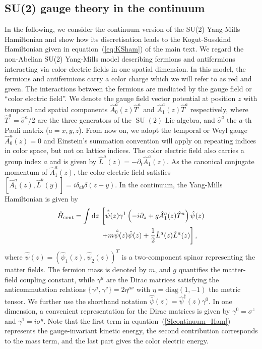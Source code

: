 \documentclass[twocolumn,aps,showpacs,prb,superscriptaddress,floatfix,10pt,nofootinbib]{revtex4-2}
\renewcommand{\eqref}[1]{equation~(\ref{#1})}
\begin{document}
\subsection{SU(2) gauge theory in the continuum}
\label{SI:continuum}
In the following, we consider the continuum version of the SU(2) Yang-Mills Hamiltonian and show how its discretisation leads to the Kogut-Susskind Hamiltonian given in \eqref{eq:KSham} of the main text. 
We regard the non-Abelian SU(2) Yang-Mills model describing fermions and antifermions interacting via color electric fields in one spatial dimension. In this model, the fermions and antifermions carry a color charge which we will refer to as red and green. The interactions between the fermions are mediated by the gauge field or ``color electric field''. We denote the gauge field vector potential at position $z$ with temporal and spatial components $\hat{A}_{0}^{a}(z)\hat{T}^{a}$ and $\hat{A}_{1}^{a}(z)\hat{T}^{a}$ respectively, where $\hat{T}^{a}=\hat{\sigma}^{a}/2$ are the three generators of the $\operatorname{SU}(2)$ Lie algebra, and $\hat{\sigma}^{a}$ the $a$-th Pauli matrix ($a=x,y,z$). From now on, we adopt the temporal or Weyl gauge $\hat{A}_{0}^{a}(z)=0$ and Einstein's summation convention will apply on repeating indices in color space, but not on lattice indices. The color electric field also carries a group index $a$ and is given by $\hat{L}^{a}(z)=-\partial_{t}\hat{A}_{1}^{a}(z)$. As the canonical conjugate momentum of $\hat{A}_{1}^{a}(z)$, the color electric field satisfies $[\hat{A}_{1}^{a}(z),\hat{L}^{b}(y)]=i\delta_{ab}\delta(z-y)$. In the continuum, the Yang-Mills Hamiltonian is given by \cite{jackiw1980introduction}
\begin{equation}
\begin{split}
\hat{H}_{\mathrm{cont}} =\int \mathrm{d}z  \, & \left[ {\vphantom{\frac{1}{2}}} \hat{\bar{\psi}}(z)\gamma^{1}\left( -i\partial_{z}+g\hat{A}_{1}^{a}(z)\hat{T}^{a}\right)\hat{\psi}(z) \right. \\
& \left. + m \hat{\bar{\psi}}(z)\hat{\psi}(z)+\frac{1}{2}\hat{L}^{a}(z)\hat{L}^{a}(z) \right],
\end{split} \label{SIcontinuum_Ham}
\end{equation}
where $\hat{\psi}(z)=(\hat{\psi}_{1}(z),\hat{\psi}_{2}(z))^{T}$ is a two-component spinor representing the matter fields. The fermion mass is denoted by $m$, and $g$ quantifies the matter-field coupling constant, while $\gamma^{\mu}$ are the Dirac matrices satisfying the anticommutation relations $\lbrace \gamma^{\mu},\gamma^{\nu} \rbrace =2\eta^{\mu \nu}$ with $\eta=\mathrm{diag}(1,-1)$ the metric tensor. We further use the shorthand notation $\hat{\bar{\psi}}(z)=\hat{\psi}^{\dagger}(z)\gamma^{0}$. 
In one dimension, a convenient representation for the Dirac matrices is given by $\gamma^{0}=\sigma^{z}$ and $\gamma^{1}=i\sigma^{y}$. Note that the first term in equation~(\ref{SIcontinuum_Ham}) represents the gauge-invariant kinetic energy, the second contribution corresponds to the mass term, and the last part gives the color electric energy.
\end{document}
